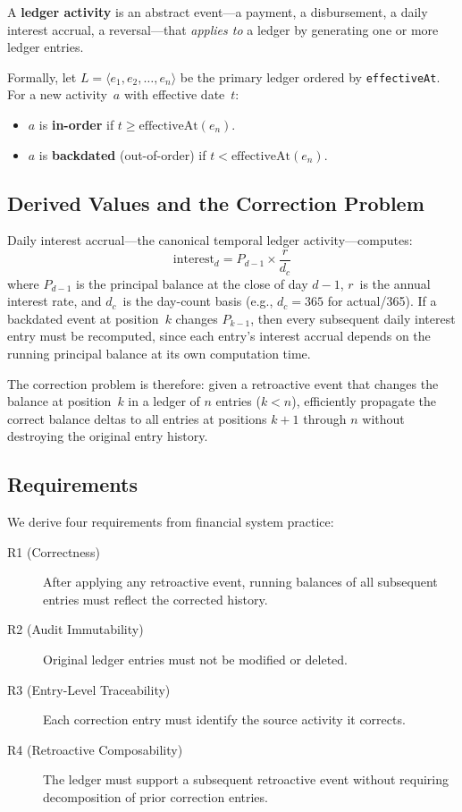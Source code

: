 \documentclass[11pt,letterpaper]{article}
\begin{document}
A \textbf{ledger activity} is an abstract event---a payment, a
disbursement, a daily interest accrual, a reversal---that \emph{applies
to} a ledger by generating one or more ledger entries.

Formally, let $L = \langle e_1, e_2, \ldots, e_n \rangle$ be the
primary ledger ordered by \texttt{effectiveAt}. For a new activity~$a$
with effective date~$t$:
\begin{itemize}
  \item $a$ is \textbf{in-order} if $t \geq \text{effectiveAt}(e_n)$.
  \item $a$ is \textbf{backdated} (out-of-order) if
        $t < \text{effectiveAt}(e_n)$.
\end{itemize}

\subsection{Derived Values and the Correction Problem}

Daily interest accrual---the canonical temporal ledger activity---computes:
\begin{equation}
  \text{interest}_d = P_{d-1} \times \frac{r}{d_c}
\end{equation}
where $P_{d-1}$ is the principal balance at the close of day $d-1$,
$r$~is the annual interest rate, and $d_c$~is the day-count basis
(e.g., $d_c = 365$ for actual/365). If a
backdated event at position~$k$ changes $P_{k-1}$, then every
subsequent daily interest entry must be recomputed, since each entry's
interest accrual depends on the running principal balance at its own
computation time.

The correction problem is therefore: given a retroactive event that
changes the balance at position~$k$ in a ledger of $n$ entries
($k < n$), efficiently propagate the correct balance deltas to all
entries at positions $k{+}1$ through $n$ without destroying the
original entry history.

\subsection{Requirements}

We derive four requirements from financial system practice:

\begin{description}
  \item[R1 (Correctness)] After applying any retroactive event, running
    balances of all subsequent entries must reflect the corrected history.
  \item[R2 (Audit Immutability)] Original ledger entries must not be
    modified or deleted.
  \item[R3 (Entry-Level Traceability)] Each correction entry must
    identify the source activity it corrects.
  \item[R4 (Retroactive Composability)] The ledger must support a
    subsequent retroactive event without requiring decomposition of
    prior correction entries.
\end{description}
\end{document}
